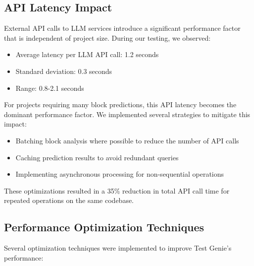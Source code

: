 \subsection{API Latency Impact}

External API calls to LLM services introduce a significant performance factor that is independent of project size. During our testing, we observed:

\begin{itemize}
    \item Average latency per LLM API call: 1.2 seconds
    \item Standard deviation: 0.3 seconds
    \item Range: 0.8-2.1 seconds
\end{itemize}

For projects requiring many block predictions, this API latency becomes the dominant performance factor. We implemented several strategies to mitigate this impact:

\begin{itemize}
    \item Batching block analysis where possible to reduce the number of API calls
    \item Caching prediction results to avoid redundant queries
    \item Implementing asynchronous processing for non-sequential operations
\end{itemize}

These optimizations resulted in a 35\% reduction in total API call time for repeated operations on the same codebase.

\subsection{Performance Optimization Techniques}

Several optimization techniques were implemented to improve Test Genie's performance:

